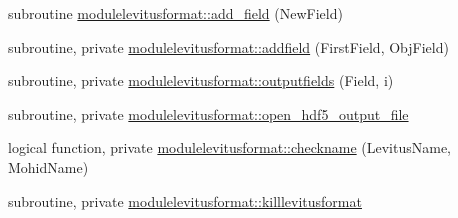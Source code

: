\begin{DoxyCompactItemize}
\item 
subroutine \mbox{\hyperlink{namespacemodulelevitusformat_a8b8115698d0550d00e51cdfacfac4849}{modulelevitusformat\+::add\+\_\+field}} (New\+Field)
\item 
subroutine, private \mbox{\hyperlink{namespacemodulelevitusformat_a37cf54f54483fb6da9fe84dbb77e0826}{modulelevitusformat\+::addfield}} (First\+Field, Obj\+Field)
\item 
subroutine, private \mbox{\hyperlink{namespacemodulelevitusformat_aabed50c7effe5d563a35ce0013a4ec93}{modulelevitusformat\+::outputfields}} (Field, i)
\item 
subroutine, private \mbox{\hyperlink{namespacemodulelevitusformat_a43a015e528279df64ee7b5856bb08147}{modulelevitusformat\+::open\+\_\+hdf5\+\_\+output\+\_\+file}}
\item 
logical function, private \mbox{\hyperlink{namespacemodulelevitusformat_a0140480b31ea48c6b48c75a6944bf406}{modulelevitusformat\+::checkname}} (Levitus\+Name, Mohid\+Name)
\item 
subroutine, private \mbox{\hyperlink{namespacemodulelevitusformat_aee602b5ad04c2069cd2ddaea3d922bf9}{modulelevitusformat\+::killlevitusformat}}
\end{DoxyCompactItemize}
